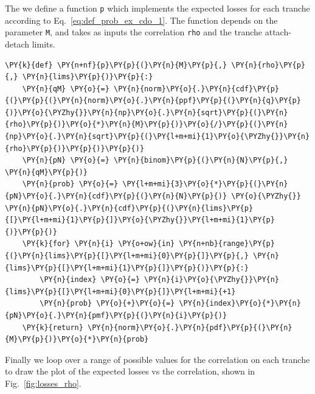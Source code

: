 The we define a function \texttt{p} which implements the expected losses for each tranche according to Eq.~\ref{eq:def_prob_ex_cdo_1}.
The function depends on the parameter \texttt{M}, and takes as inputs the correlation \texttt{rho} and the tranche attach-detach limits.
	
\begin{tcolorbox}[breakable, size=fbox, boxrule=1pt, pad at break*=1mm,colback=cellbackground, colframe=cellborder]
\begin{Verbatim}[commandchars=\\\{\}]
\PY{k}{def} \PY{n+nf}{p}\PY{p}{(}\PY{n}{M}\PY{p}{,} \PY{n}{rho}\PY{p}{,} \PY{n}{lims}\PY{p}{)}\PY{p}{:}
    \PY{n}{qM} \PY{o}{=} \PY{n}{norm}\PY{o}{.}\PY{n}{cdf}\PY{p}{(}\PY{p}{(}\PY{n}{norm}\PY{o}{.}\PY{n}{ppf}\PY{p}{(}\PY{n}{q}\PY{p}{)}\PY{o}{\PYZhy{}}\PY{n}{np}\PY{o}{.}\PY{n}{sqrt}\PY{p}{(}\PY{n}{rho}\PY{p}{)}\PY{o}{*}\PY{n}{M}\PY{p}{)}\PY{o}{/}\PY{p}{(}\PY{n}{np}\PY{o}{.}\PY{n}{sqrt}\PY{p}{(}\PY{l+m+mi}{1}\PY{o}{\PYZhy{}}\PY{n}{rho}\PY{p}{)}\PY{p}{)}\PY{p}{)}
    \PY{n}{pN} \PY{o}{=} \PY{n}{binom}\PY{p}{(}\PY{n}{N}\PY{p}{,} \PY{n}{qM}\PY{p}{)}
    \PY{n}{prob} \PY{o}{=} \PY{l+m+mi}{3}\PY{o}{*}\PY{p}{(}\PY{n}{pN}\PY{o}{.}\PY{n}{cdf}\PY{p}{(}\PY{n}{N}\PY{p}{)} \PY{o}{\PYZhy{}} \PY{n}{pN}\PY{o}{.}\PY{n}{cdf}\PY{p}{(}\PY{n}{lims}\PY{p}{[}\PY{l+m+mi}{1}\PY{p}{]}\PY{o}{\PYZhy{}}\PY{l+m+mi}{1}\PY{p}{)}\PY{p}{)}
    \PY{k}{for} \PY{n}{i} \PY{o+ow}{in} \PY{n+nb}{range}\PY{p}{(}\PY{n}{lims}\PY{p}{[}\PY{l+m+mi}{0}\PY{p}{]}\PY{p}{,} \PY{n}{lims}\PY{p}{[}\PY{l+m+mi}{1}\PY{p}{]}\PY{p}{)}\PY{p}{:}
        \PY{n}{index} \PY{o}{=} \PY{n}{i}\PY{o}{\PYZhy{}}\PY{n}{lims}\PY{p}{[}\PY{l+m+mi}{0}\PY{p}{]}\PY{l+m+mi}{+1}
        \PY{n}{prob} \PY{o}{+}\PY{o}{=} \PY{n}{index}\PY{o}{*}\PY{n}{pN}\PY{o}{.}\PY{n}{pmf}\PY{p}{(}\PY{n}{i}\PY{p}{)}  
    \PY{k}{return} \PY{n}{norm}\PY{o}{.}\PY{n}{pdf}\PY{p}{(}\PY{n}{M}\PY{p}{)}\PY{o}{*}\PY{n}{prob}
\end{Verbatim}
\end{tcolorbox}

Finally we loop over a range of possible values for the correlation on each tranche to draw the plot of the expected losses vs the correlation, shown in Fig.~\ref{fig:losses_rho}.

